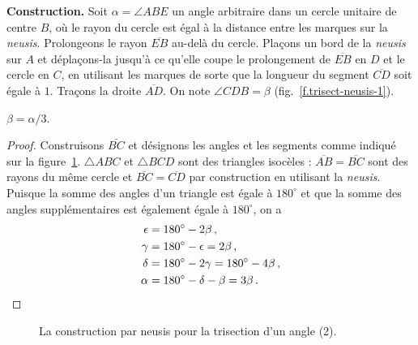 \noindent\textbf{Construction.}
Soit $\alpha=\angle ABE$ un angle arbitraire dans un cercle unitaire de centre $B$, où le rayon du cercle est égal à la distance entre les marques sur la \emph{neusis}. Prolongeons le rayon $\overline{EB}$ au-delà du cercle. Plaçons un bord de la \emph{neusis} sur $A$ et déplaçons-la  jusqu'à ce qu'elle coupe le prolongement de $\overline{EB}$ en $D$ et le cercle en $C$, en utilisant les marques de sorte que la longueur du segment  $\overline{CD}$ soit égale à $1$. Traçons la droite $\overline{AD}$. On note $\angle CDB=\beta$ (fig.~\ref{f.trisect-neusis-1}).

\begin{theorem} $\beta=\alpha/3$.
\end{theorem}
\begin{proof}
Construisons $\overline{BC}$ et désignons les angles et les segments  comme indiqué sur la figure~\ref{f.trisect-neusis-2}.
$\triangle ABC$ et $\triangle BCD$ sont des triangles isocèles : $\overline{AB} = \overline{BC}$ sont des rayons du même cercle et $\overline{BC} = \overline{CD}$ par construction en utilisant la \emph{neusis}. Puisque la somme des angles d'un triangle est égale à $180^\circ$ et que la somme des angles supplémentaires est également égale à $180^\circ$, on a 
\begin{align*}
\epsilon &= 180^\circ - 2\beta\,,\\
\gamma &= 180^\circ - \epsilon = 2\beta\,,\\
\delta &= 180^\circ - 2\gamma = 180^\circ - 4\beta\,,\\
\alpha &= 180^\circ - \delta - \beta=3\beta\,.\qedhere
\end{align*}
\end{proof}

\begin{figure}[htbp]
\centering
{}
\caption{La construction par neusis pour la trisection d'un angle  (2).}\label{f.trisect-neusis-2}
\end{figure}

